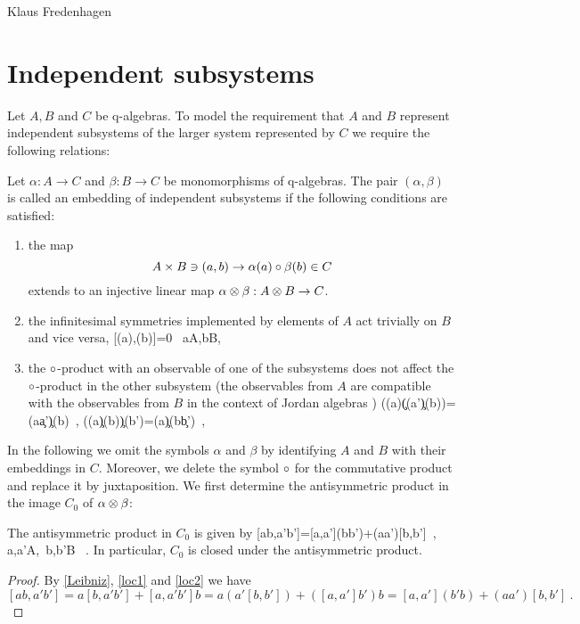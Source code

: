 \begin{artengenv}{Klaus Fredenhagen}
\section{Independent subsystems}
Let $A,B$ and $C$ be q-algebras.
To model the requirement that $A$ and $B$ represent independent subsystems of the larger system represented by $C$ we require the following relations:
\begin{definition-fred}\label{independent}
Let $\alpha:A\to C$ and $\beta:B\to C$ be monomorphisms of q-algebras. The pair $(\alpha,\beta)$ is called an embedding of independent subsystems if the following conditions are satisfied: 
\begin{enumerate}\label{composition}
\item the map
\[A\times B\ni(a,b)\to \alpha(a)\circ\beta(b)\in C \]
extends to an injective linear map  $\alpha\otimes\beta:A\otimes B\to C$.
\item the infinitesimal symmetries implemented by elements of $A$ act trivially on $B$ and vice versa,
 \be\label{loc1}[\alpha(a),\beta(b)]=0 \ \forall a\in A,b\in B, \ \ee
\item the $\circ$-product with an observable of one of the subsystems does not affect the $\circ$-product in the other subsystem (the observables from $A$ are compatible with the observables from $B$ in the context of Jordan algebras \parencite{HS})
\be\label{loc2}(\alpha(a)\c(\alpha(a')\c\beta(b))=\alpha(a\c a')\c\beta(b)\ , (\alpha(a)\c\beta(b))\c\beta(b')=\alpha(a)\c\beta(b\c b')\ ,\ee
\end{enumerate}
\end{definition-fred}
In the following we omit the symbols $\alpha$ and $\beta$ by identifying $A$ and $B$ with their embeddings in $C$. Moreover, we delete the symbol $\circ$ for the commutative product and replace it by juxtaposition. 
We first determine the antisymmetric product in the image $C_0$ of $\alpha\otimes\beta$:
\begin{lemma-fred}
The antisymmetric product in $C_0$ is given by
\be\label{LieC}[ab,a'b']=[a,a'](bb')+(aa')[b,b']\ , a,a'\in A,\ b,b'\in B \ .\ee
In particular, $C_0$ is closed under the antisymmetric product.
\end{lemma-fred}
\begin{proof}
By \eqref{Leibniz}, \eqref{loc1} and \eqref{loc2} we have
\[[ab,a'b']=a[b,a'b']+[a,a'b']b=a(a'[b,b'])+([a,a']b')b=[a,a'](b'b)+(aa')[b,b']\ .\]
\end{proof}

\end{artengenv}

